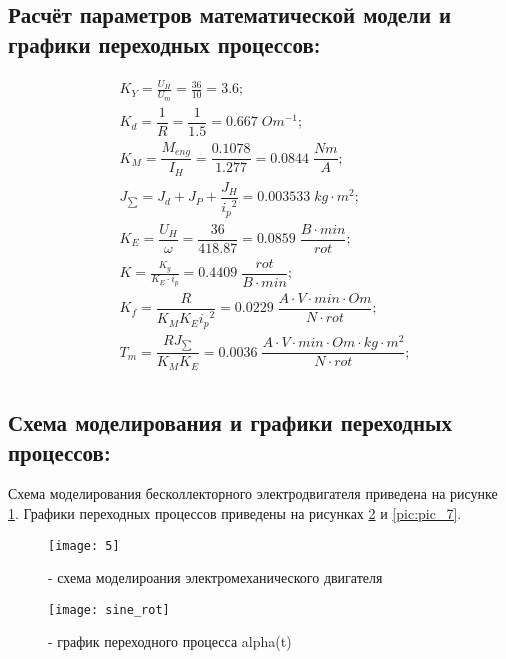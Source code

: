 \subsection{Расчёт параметров математической модели и графики переходных процессов:}
\begin{equation}
	\begin{split}
		&K_Y=\frac{U_H}{U_m}=\frac{36}{10}=3.6;\\
		&K_d=\dfrac{1}{R}=\dfrac{1}{1.5}=0.667\; Om^{-1};\\
		&K_M=\dfrac{M_{eng}}{I_H}=\dfrac{0.1078}{1.277}=0.0844\; \dfrac{Nm}{A};\\
		&J_{\sum}=J_d+J_P+\dfrac{J_H}{{i_p}^2}=0.003533\;kg\cdot m^2;\\
		&K_E=\dfrac{U_H}{\omega}=\dfrac{36}{418.87}=0.0859\; \dfrac{B\cdot min}{rot};\\
		&K=\frac{K_y}{K_E\cdot i_p}=0.4409\; \dfrac{rot}{B\cdot min};\\
		&K_f=\dfrac{R}{K_MK_E{i_p}^2}=0.0229\; \dfrac{A\cdot V\cdot min\cdot Om}{N\cdot rot};\\
		&T_m=\dfrac{RJ_{\sum}}{K_MK_E} = 0.0036\; \dfrac{A\cdot V\cdot min\cdot Om\cdot kg \cdot m^2}{N\cdot rot};\\
	\end{split}			
\end{equation}

\subsection{Схема моделирования и графики переходных процессов:}
Схема моделирования бесколлекторного электродвигателя приведена на рисунке \ref{pic:pic_5}. Графики переходных процессов приведены на рисунках \ref{pic:pic_6} и \ref{pic:pic_7}.
\begin{figure}[H]
	\begin{center}
		\texttt{[image: 5]}
		\caption{- схема моделироания электромеханического двигателя} 
		\label{pic:pic_5} %
	\end{center}
\end{figure}

\begin{figure}[H]
	\begin{center}
		\texttt{[image: sine\_rot]}
		\caption{- график переходного процесса alpha(t)} 
		\label{pic:pic_6} %
	\end{center}
\end{figure}

